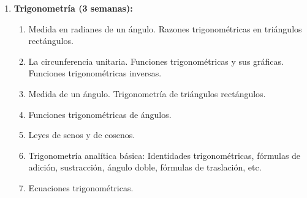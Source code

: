 \begin{refsection}
\begin{enumerate}
\begin{enumerate}
    \item Exponentes y radicales: exponentes enteros, exponentes racionales, leyes de potencias, radicales y racionalización.

    \item Expresiones algebraicas: suma y resta de polinomios, multiplicación de expresiones algebraicas, fórmulas de productos notables, factorización de factores comunes, factorización de trinomios, fórmulas especiales de factorización, factorización por agrupación de términos. 

    \item Expresiones racionales: dominio de una expresión algebraica, simplificación de expresiones racionales, multiplicación y división de expresiones racionales, suma y resta de expresiones racionales, fracciones compuestas, racionalización del denominador o el numerador.

    \item Ecuaciones: solución de ecuaciones lineales, cuadráticas, con radicales, con valor absoluto y racionales.
    
    \item Desigualdades: propiedades básicas de desigualdades, resolución de desigualdades lineales y no lineales básicas. Desigualdades con valor absoluto.
    \item Geometría de coordenadas básica: el plano coordenado, las fórmulas para la distancia y el punto medio, círculos.
\end{enumerate}

\item \textbf{Trigonometría (3 semanas):} 
\begin{enumerate}
    \item Medida en radianes de un ángulo. Razones trigonométricas en triángulos rectángulos. 
    \item La circunferencia unitaria. Funciones trigonométricas y sus gráficas. Funciones trigonométricas inversas.
    \item Medida de un ángulo. Trigonometría de triángulos rectángulos. 
    \item Funciones trigonométricas de ángulos.
    \item Leyes de senos y de cosenos.
    \item Trigonometría analítica básica: Identidades trigonométricas, fórmulas de adición, sustracción, ángulo doble, fórmulas de traslación, etc.
    \item Ecuaciones trigonométricas.
\end{enumerate}


\end{enumerate}
\end{refsection}

